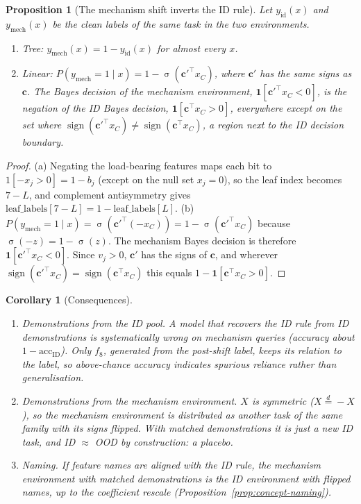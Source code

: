 \documentclass[11pt,a4paper]{article}
\newcommand{\1}{\mathbf{1}}
\DeclareMathOperator{\sign}{sign}
\DeclareMathOperator{\sigmoid}{\sigma}
\theoremstyle{plain}
\newtheorem{proposition}[theorem]{Proposition}
\newtheorem{corollary}[theorem]{Corollary}
\theoremstyle{definition}
\theoremstyle{remark}
\begin{document}
\begin{proposition}[The mechanism shift inverts the ID rule]
\label{prop:mechanism}
Let $y_{\mathrm{id}}(x)$ and $y_{\mathrm{mech}}(x)$ be the clean labels of the
same task in the two environments.
\begin{enumerate}[nosep,label=(\alph*)]
  \item Tree: $y_{\mathrm{mech}}(x) = 1 - y_{\mathrm{id}}(x)$ for almost every $x$.
  \item Linear: $P(y_{\mathrm{mech}} = 1 \mid x) = 1 - \sigmoid(\mathbf{c}'^\top x_C)$,
        where $\mathbf{c}'$ has the same signs as $\mathbf{c}$. The Bayes
        decision of the mechanism environment, $\1[\mathbf{c}'^\top x_C < 0]$,
        is the negation of the ID Bayes decision, $\1[\mathbf{c}^\top x_C > 0]$,
        everywhere except on the set where $\sign(\mathbf{c}'^\top x_C) \neq
        \sign(\mathbf{c}^\top x_C)$, a region next to the ID decision
        boundary.
\end{enumerate}
\end{proposition}
\begin{proof}
(a) Negating the load-bearing features maps each bit to
$1[-x_j > 0] = 1 - b_j$ (except on the null set $x_j = 0$), so the leaf
index becomes $7 - L$, and complement antisymmetry gives
$\text{leaf\_labels}[7-L] = 1 - \text{leaf\_labels}[L]$.
(b) $P(y_{\mathrm{mech}}=1\mid x) = \sigmoid(\mathbf{c}'^\top(-x_C)) =
1 - \sigmoid(\mathbf{c}'^\top x_C)$ because $\sigmoid(-z) = 1 - \sigmoid(z)$.
The mechanism Bayes decision is therefore $\1[\mathbf{c}'^\top x_C < 0]$.
Since $v_j > 0$, $\mathbf{c}'$ has the signs of $\mathbf{c}$, and wherever
$\sign(\mathbf{c}'^\top x_C) = \sign(\mathbf{c}^\top x_C)$ this equals
$1 - \1[\mathbf{c}^\top x_C > 0]$.
\end{proof}

\begin{corollary}[Consequences]
\begin{enumerate}[nosep,label=(\roman*)]
  \item \emph{Demonstrations from the ID pool.} A model that recovers the ID
        rule from ID demonstrations is systematically wrong on mechanism
        queries (accuracy about $1 - \mathrm{acc}_{\mathrm{ID}}$). Only $f_8$,
        generated from the post-shift label, keeps its relation to the
        label, so above-chance accuracy indicates spurious reliance rather
        than generalisation.
  \item \emph{Demonstrations from the mechanism environment.} $X$ is
        symmetric ($X \stackrel{d}{=} -X$), so the mechanism environment is
        distributed as another task of the same family with its signs
        flipped. With matched demonstrations it is just a new ID task, and
        ID $\approx$ OOD by construction: a placebo.
  \item \emph{Naming.} If feature names are aligned with the ID rule, the
        mechanism environment with matched demonstrations is the ID
        environment with flipped names, up to the coefficient rescale
        (Proposition~\ref{prop:concept-naming}).
\end{enumerate}
\end{corollary}
\end{document}
